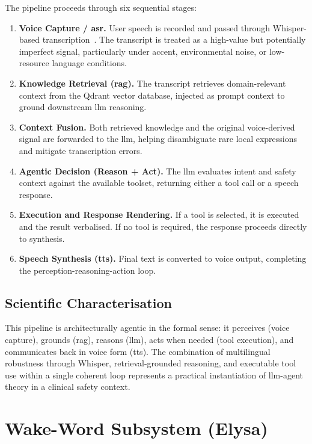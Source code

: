 \documentclass[10pt,twocolumn,a4paper]{article}
\begin{document}
The pipeline proceeds through six sequential stages:
\begin{enumerate}
  \item \textbf{Voice Capture / \gls{asr}.}  User speech is recorded and
        passed through Whisper-based transcription~\cite{whisper2023}.
        The transcript is treated as a high-value but potentially
        imperfect signal, particularly under accent, environmental
        noise, or low-resource language conditions.
  \item \textbf{Knowledge Retrieval (\gls{rag}).}  The transcript
        retrieves domain-relevant context from the Qdrant vector
        database, injected as prompt context to ground downstream
        \gls{llm} reasoning.
  \item \textbf{Context Fusion.}  Both retrieved knowledge and the
        original voice-derived signal are forwarded to the \gls{llm},
        helping disambiguate rare local expressions and mitigate
        transcription errors.
  \item \textbf{Agentic Decision (Reason + Act).}  The \gls{llm}
        evaluates intent and safety context against the available
        toolset, returning either a tool call or a speech response.
  \item \textbf{Execution and Response Rendering.}  If a tool is
        selected, it is executed and the result verbalised.  If no
        tool is required, the response proceeds directly to synthesis.
  \item \textbf{Speech Synthesis (\gls{tts}).}  Final text is
        converted to voice output, completing the
        perception-reasoning-action loop.
\end{enumerate}

\subsection{Scientific Characterisation}

This pipeline is architecturally agentic in the formal sense: it
perceives (voice capture), grounds (\gls{rag}), reasons (\gls{llm}),
acts when needed (tool execution), and communicates back in voice form
(\gls{tts}).  The combination of multilingual robustness through
Whisper, retrieval-grounded reasoning, and executable tool use within a
single coherent loop represents a practical instantiation of
\gls{llm}-agent theory in a clinical safety context.

\section{Wake-Word Subsystem (Elysa)}
\end{document}

